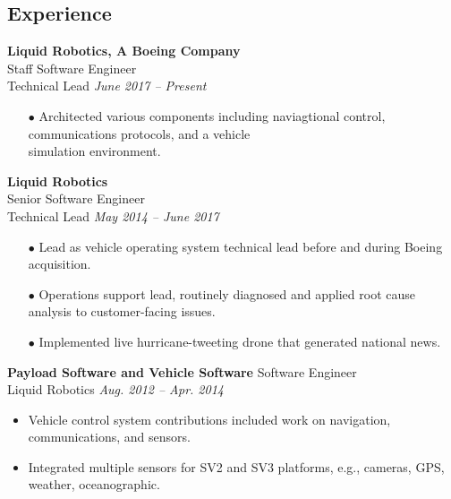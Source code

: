 \documentclass{article}
\begin{document}
{\begin{multicols}{2}
\section*{Experience}
\noindent
    \textbf{Liquid Robotics, A Boeing Company}\\
    Staff Software Engineer\\
    Technical Lead \hfill \textsl{June 2017 -- Present} \\
    \vspace{ -10px}
    \begin{itemize}[noitemsep,nolistsep]
        \item[\tiny$\bullet$ ]Architected various components including naviagtional control, communications protocols, and a vehicle \\ simulation environment.
    \end{itemize}
    \vspace{5px}
    \textbf{Liquid Robotics}\\
    Senior Software Engineer\\
    Technical Lead \hfill \textsl{May 2014 -- June 2017} \\
    \vspace{ -10px}
    \begin{itemize}[noitemsep,nolistsep]
         \item[\tiny$\bullet$] Lead as vehicle operating system technical lead before and during Boeing acquisition.
         \item[\tiny$\bullet$] Operations support lead, routinely diagnosed and applied root cause analysis to customer-facing issues.
         \item[\tiny$\bullet$] Implemented live hurricane-tweeting drone that generated national news.
    \end{itemize}
    \vspace{5px}

    \textbf{Payload Software and Vehicle Software} \hfill Software Engineer\\  
    Liquid Robotics \hfill \textsl{Aug. 2012 -- Apr. 2014} \\
    \vspace{ -2 mm}
    \begin{itemize}
        \item Vehicle control system contributions included work on navigation, communications, and sensors.
        \item Integrated multiple sensors for SV2 and SV3 platforms, e.g., cameras, GPS, weather, oceanographic.
    \end{itemize}\vspace{-2mm}


\end{multicols}}
\end{document}
